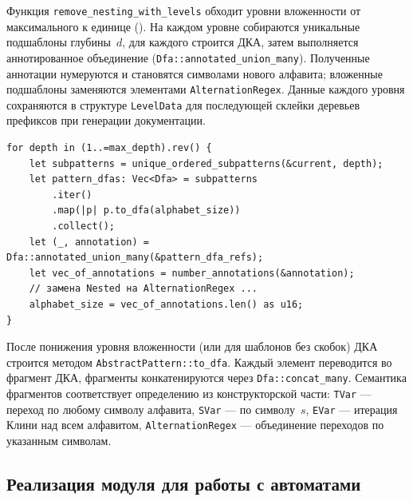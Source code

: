 
Функция \texttt{remove\_nesting\_with\_levels} обходит уровни вложенности от максимального к единице ().
На каждом уровне собираются уникальные подшаблоны глубины~$d$, для каждого строится ДКА, затем выполняется аннотированное объединение (\texttt{Dfa::annotated\_union\_many}).
Полученные аннотации нумеруются и становятся символами нового алфавита; вложенные подшаблоны заменяются элементами \texttt{AlternationRegex}.
Данные каждого уровня сохраняются в структуре \texttt{LevelData} для последующей склейки деревьев префиксов при генерации документации.

\begin{listing}[H]
\caption{Цикл понижения максимальной глубины вложенности абстрактных шаблонов}
\label{lst:remove-nesting}
\begin{verbatim}
for depth in (1..=max_depth).rev() {
    let subpatterns = unique_ordered_subpatterns(&current, depth);
    let pattern_dfas: Vec<Dfa> = subpatterns
        .iter()
        .map(|p| p.to_dfa(alphabet_size))
        .collect();
    let (_, annotation) = Dfa::annotated_union_many(&pattern_dfa_refs);
    let vec_of_annotations = number_annotations(&annotation);
    // замена Nested на AlternationRegex ...
    alphabet_size = vec_of_annotations.len() as u16;
}
\end{verbatim}
\end{listing}

После понижения уровня вложенности (или для шаблонов без скобок) ДКА строится методом \texttt{AbstractPattern::to\_dfa}.
Каждый элемент переводится во фрагмент ДКА, фрагменты конкатенируются через \texttt{Dfa::concat\_many}.
Семантика фрагментов соответствует определению из конструкторской части: \texttt{TVar} --- переход по любому символу алфавита, \texttt{SVar} --- по символу~$s$, \texttt{EVar} --- итерация Клини над всем алфавитом, \texttt{AlternationRegex} --- объединение переходов по указанным символам.

\subsection{Реализация модуля для работы с автоматами}

